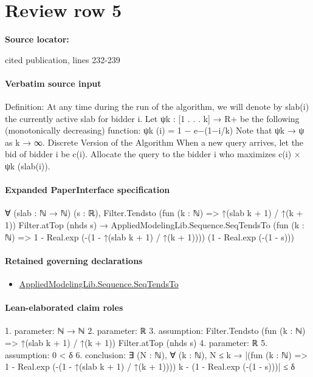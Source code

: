 \documentclass[10pt]{article}
\begin{document}
\section*{Review row 5}
\textbf{Source locator:} {\footnotesize\raggedright cited publication, lines 232-\allowbreak{}239\par}
\paragraph{Verbatim source input}
\begin{ReviewVerbatim}
Definition: At any time during the run of the algorithm, we will denote by slab(i) the
currently active slab for bidder i.
Let ψk : [1 . . . k] → R+ be the following (monotonically decreasing) function:
ψk (i) = 1 − e−(1−i/k)
Note that ψk → ψ as k → ∞.
Discrete Version of the Algorithm
When a new query arrives, let the bid of bidder i be c(i). Allocate the query to the
bidder i who maximizes c(i) × ψk (slab(i)).
\end{ReviewVerbatim}



\paragraph{Expanded PaperInterface specification}
\begin{ReviewVerbatim}
∀ (slab : ℕ → ℕ) (s : ℝ),
  Filter.Tendsto (fun (k : ℕ) => ↑(slab k + 1) / ↑(k + 1)) Filter.atTop (nhds s) →
    AppliedModelingLib.Sequence.SeqTendsTo (fun (k : ℕ) => 1 - Real.exp (-(1 - ↑(slab k + 1) / ↑(k + 1))))
      (1 - Real.exp (-(1 - s)))
\end{ReviewVerbatim}

\paragraph{Retained governing declarations}
\begin{itemize}\raggedright
\item \hyperlink{governing-declaration-ed891837c3cd4610}{Applied\allowbreak{}Modeling\allowbreak{}Lib.\allowbreak{}Sequence.\allowbreak{}Seq\allowbreak{}Tends\allowbreak{}To}
\end{itemize}
\paragraph{Lean-elaborated claim roles}\begin{ReviewVerbatim}
1. parameter: ℕ → ℕ
2. parameter: ℝ
3. assumption: Filter.Tendsto (fun (k : ℕ) => ↑(slab k + 1) / ↑(k + 1)) Filter.atTop (nhds s)
4. parameter: ℝ
5. assumption: 0 < δ
6. conclusion: ∃ (N : ℕ),
  ∀ (k : ℕ), N ≤ k → |(fun (k : ℕ) => 1 - Real.exp (-(1 - ↑(slab k + 1) / ↑(k + 1)))) k - (1 - Real.exp (-(1 - s)))| ≤ δ
\end{ReviewVerbatim}
\end{document}

